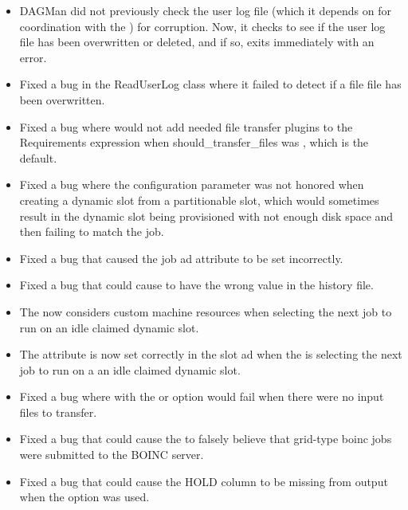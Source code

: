 \begin{itemize}
\item DAGMan did not previously check the user log file (which it depends on for
coordination with the ) for corruption. Now, it checks to see if the user log
file has been overwritten or deleted, and if so, exits immediately with an error.

\item Fixed a bug in the ReadUserLog class where it failed to detect if a file
file has been overwritten.

\item Fixed a bug where  would not add needed file transfer plugins to the
Requirements expression when should\_transfer\_files was , which is the default.

\item Fixed a bug where the configuration parameter  was
not honored when creating a dynamic slot from a partitionable slot, which would sometimes result
in the dynamic slot being provisioned with not enough disk space and then failing to match the job.

\item Fixed a bug that caused the job ad attribute
 to be set incorrectly.

\item Fixed a bug that could cause  to have
the wrong value in the history file.

\item The  now considers custom machine resources when
selecting the next job to run on an idle claimed dynamic slot.

\item The attribute  is now set correctly in the slot
ad when the  is selecting the next job to run on a an
idle claimed dynamic slot.

\item Fixed a bug where  with the  or
 option would fail when there were no input files to
transfer.

\item Fixed a bug that could cause the  to falsely
believe that grid-type boinc jobs were submitted to the BOINC server.

\item Fixed a bug that could cause the HOLD column to be missing from 
output when the  option was used.


\end{itemize}
